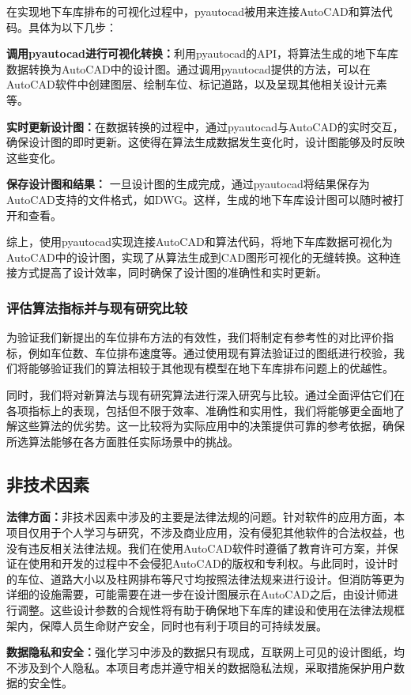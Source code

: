 在实现地下车库排布的可视化过程中，pyautocad被用来连接AutoCAD和算法代码。具体为以下几步：

{\bfseries 调用pyautocad进行可视化转换：}利用pyautocad的API，将算法生成的地下车库数据转换为AutoCAD中的设计图。通过调用pyautocad提供的方法，可以在AutoCAD软件中创建图层、绘制车位、标记道路，以及呈现其他相关设计元素等。

{\bfseries 实时更新设计图：}在数据转换的过程中，通过pyautocad与AutoCAD的实时交互，确保设计图的即时更新。这使得在算法生成数据发生变化时，设计图能够及时反映这些变化。

{\bfseries 保存设计图和结果：} 一旦设计图的生成完成，通过pyautocad将结果保存为AutoCAD支持的文件格式，如DWG。这样，生成的地下车库设计图可以随时被打开和查看。

综上，使用pyautocad实现连接AutoCAD和算法代码，将地下车库数据可视化为AutoCAD中的设计图，实现了从算法生成到CAD图形可视化的无缝转换。这种连接方式提高了设计效率，同时确保了设计图的准确性和实时更新。
\subsubsection{评估算法指标并与现有研究比较}
为验证我们新提出的车位排布方法的有效性，我们将制定有参考性的对比评价指标，例如车位数、车位排布速度等。通过使用现有算法验证过的图纸进行校验，我们将能够验证我们的算法相较于其他现有模型在地下车库排布问题上的优越性。

同时，我们将对新算法与现有研究算法进行深入研究与比较。通过全面评估它们在各项指标上的表现，包括但不限于效率、准确性和实用性，我们将能够更全面地了解这些算法的优劣势。这一比较将为实际应用中的决策提供可靠的参考依据，确保所选算法能够在各方面胜任实际场景中的挑战。
\subsection{非技术因素}
{\bfseries 法律方面：}非技术因素中涉及的主要是法律法规的问题。针对软件的应用方面，本项目仅用于个人学习与研究，不涉及商业应用，没有侵犯其他软件的合法权益，也没有违反相关法律法规。我们在使用AutoCAD软件\cite{JCJG202304039}时遵循了教育许可方案，并保证在使用和开发的过程中不会侵犯AutoCAD的版权和专利权。与此同时，设计时的车位、道路大小以及柱网排布等尺寸均按照法律法规来进行设计。但消防等更为详细的设施需要，可能需要在进一步在设计图展示在AutoCAD之后，由设计师进行调整。这些设计参数的合规性将有助于确保地下车库的建设和使用在法律法规框架内，保障人员生命财产安全，同时也有利于项目的可持续发展。

{\bfseries 数据隐私和安全：}强化学习中涉及的数据只有现成，互联网上可见的设计图纸，均不涉及到个人隐私。本项目考虑并遵守相关的数据隐私法规，采取措施保护用户数据的安全性。

